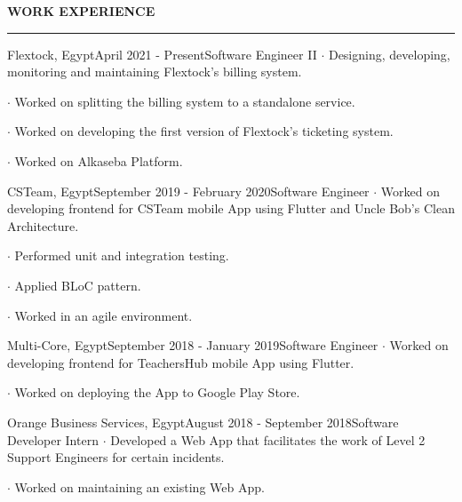 \noindent\textcolor{themecolor}{\textbf{WORK EXPERIENCE}}

\vspace{2mm}
\hrule
\vspace{3mm}

\begin{verbose}{Flextock, Egypt}{April 2021 - Present}{Software Engineer II}
    \noindent $\cdot$ Designing, developing, monitoring and maintaining Flextock's billing system.

    \noindent $\cdot$ Worked on splitting the billing system to a standalone service.

    \noindent $\cdot$ Worked on developing the first version of Flextock's ticketing system.

    \noindent $\cdot$ Worked on Alkaseba Platform.
\end{verbose}

\vspace{3mm}

\begin{verbose}{CSTeam, Egypt}{September 2019 - February 2020}{Software Engineer}
    \noindent $\cdot$ Worked on developing frontend for CSTeam mobile App using Flutter and Uncle Bob's Clean Architecture.

    \noindent $\cdot$ Performed unit and integration testing.
    
    \noindent $\cdot$ Applied BLoC pattern.
    
    \noindent $\cdot$ Worked in an agile environment.
\end{verbose}

\vspace{3mm}

\begin{verbose}{Multi-Core, Egypt}{September 2018 - January 2019}{Software Engineer}
    \noindent $\cdot$ Worked on developing frontend for TeachersHub mobile App using Flutter.

    \noindent $\cdot$ Worked on deploying the App to Google Play Store.
\end{verbose}

\vspace{3mm}

\begin{verbose}{Orange Business Services, Egypt}{August 2018 - September 2018}{Software Developer Intern}
    \noindent $\cdot$ Developed a Web App that facilitates the work of Level 2 Support Engineers for certain incidents.

    \noindent $\cdot$ Worked on maintaining an existing Web App.
\end{verbose}

